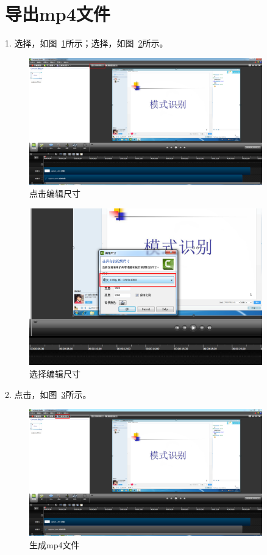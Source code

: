 \documentclass[12pt]{article}
\begin{document}
\section{导出mp4文件}\label{sec:daochu}
1. 选择{\color{blue}{编辑尺寸}}，如图~\ref{fig:fig5}所示；选择{\color{blue}{1080p}}，如图~\ref{fig:fig6}所示。\par
    \begin{figure}[!ht]
    \centering
    \includegraphics[width=0.9\textwidth]{fig5.png}
    \caption{点击编辑尺寸}
    \label{fig:fig5}
    \end{figure}
    \begin{figure}
    \centering
    \includegraphics[width=0.9\textwidth]{fig6.png}
    \caption{选择编辑尺寸}
    \label{fig:fig6}
    \end{figure}
 2. 点击{\color{blue}{生成与分享}}，如图~\ref{fig:fig7}所示。\par
     \begin{figure}
    \centering
    \includegraphics[width=0.9\textwidth]{fig7.png}
    \caption{生成mp4文件}
    \label{fig:fig7}
    \end{figure}
\end{document}

